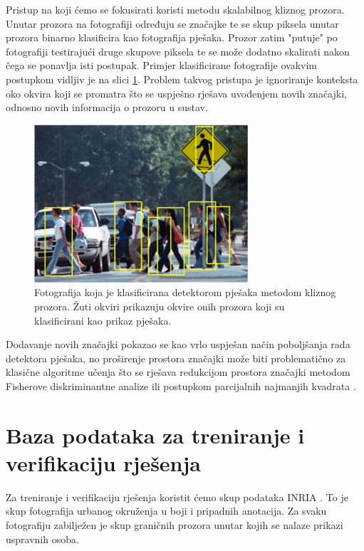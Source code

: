 \documentclass[seminar]{fer}
\begin{document}
Pristup na koji ćemo se fokusirati koristi metodu skalabilnog kliznog prozora. Unutar prozora na fotografiji određuju se značajke te se skup piksela unutar prozora binarno klasificira kao fotografija pješaka. Prozor zatim "putuje" po fotografiji testirajući druge skupove piksela te se može dodatno skalirati nakon čega se ponavlja isti postupak. Primjer klasificirane fotografije ovakvim postupkom vidljiv je na slici \ref{primjer_klasifikacije}. Problem takvog pristupa je ignoriranje konteksta oko okvira koji se promatra što se uspješno rješava uvođenjem novih značajki, odnosno novih informacija o prozoru u sustav.
\begin{figure}
\center
\includegraphics[scale=0.7]{img/crossing.png}
\caption{Fotografija koja je klasificirana detektorom pješaka metodom kliznog prozora. Žuti okviri prikazuju okvire onih prozora koji su klasificirani kao prikaz pješaka.}
\label{primjer_klasifikacije}
\end{figure}

Dodavanje novih značajki pokazao se kao vrlo uspješan način poboljšanja rada detektora pješaka, no proširenje prostora značajki može biti problematično za klasične algoritme učenja što se rješava redukcijom prostora značajki metodom Fisherove diskriminantne analize ili postupkom parcijalnih najmanjih kvadrata  \cite{Schwartz_humandetection}.

\chapter{Baza podataka za treniranje i verifikaciju rješenja}

Za treniranje i verifikaciju rješenja koristit ćemo skup podataka INRIA \cite{DT05}. To je skup fotografija urbanog okruženja u boji i pripadnih anotacija. Za svaku fotografiju zabilježen je skup graničnih prozora  unutar kojih se nalaze prikazi uspravnih osoba. %
\end{document}
